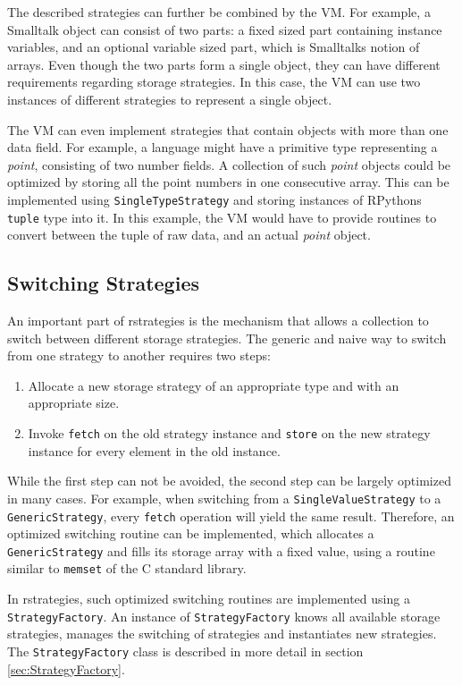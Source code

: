 The described strategies can further be combined by the VM.
For example, a Smalltalk object can consist of two parts: a fixed sized part containing instance variables, and an optional variable sized part, which is Smalltalks notion of arrays.
Even though the two parts form a single object, they can have different requirements regarding storage strategies.
In this case, the VM can use two instances of different strategies to represent a single object.

The VM can even implement strategies that contain objects with more than one data field.
For example, a language might have a primitive type representing a \emph{point}, consisting of two number fields.
A collection of such \emph{point} objects could be optimized by storing all the point numbers in one consecutive array.
This can be implemented using \lstinline{SingleTypeStrategy} and storing instances of RPythons \lstinline{tuple} type into it.
In this example, the VM would have to provide routines to convert between the tuple of raw data, and an actual \emph{point} object.


\subsection{Switching Strategies}
\label{sec:switching}

An important part of rstrategies is the mechanism that allows a collection to switch between different storage strategies.
The generic and naive way to switch from one strategy to another requires two steps:

\begin{enumerate}
\item{Allocate a new storage strategy of an appropriate type and with an appropriate size.}
\item{Invoke \lstinline{fetch} on the old strategy instance and \lstinline{store} on the new strategy instance for every element in the old instance.}
\end{enumerate}

While the first step can not be avoided, the second step can be largely optimized in many cases.
For example, when switching from a \lstinline{SingleValueStrategy} to a \lstinline{GenericStrategy}, every \lstinline{fetch} operation will yield the same result.
Therefore, an optimized switching routine can be implemented, which allocates a \lstinline{GenericStrategy} and fills its storage array with a fixed value, using a routine similar to \lstinline{memset} of the C standard library.

In rstrategies, such optimized switching routines are implemented using a \lstinline{StrategyFactory}.
An instance of \lstinline{StrategyFactory} knows all available storage strategies, manages the switching of strategies and instantiates new strategies.
The \lstinline{StrategyFactory} class is described in more detail in section \ref{sec:StrategyFactory}.
